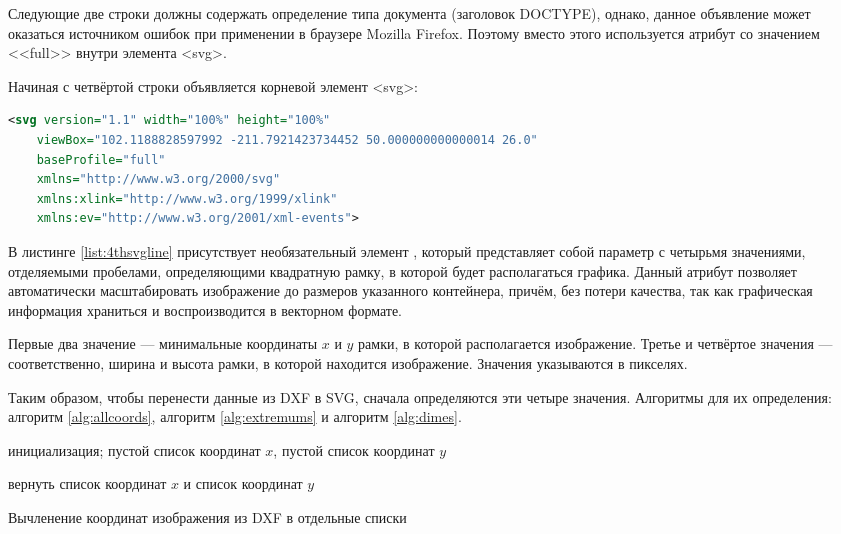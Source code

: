 Следующие две строки должны содержать определение типа документа (заголовок DOCTYPE), однако, данное объявление может оказаться источником ошибок при применении в браузере Mozilla Firefox. Поэтому вместо этого используется атрибут  со значением <<full>> внутри элемента <svg>.

Начиная с четвёртой строки объявляется корневой элемент <svg>:

\begin{lstlisting}[language=XML,caption={Первая строка SVG-файлов},label=list:4thsvgline]
	<svg version="1.1" width="100%" height="100%"
	viewBox="102.1188828597992 -211.7921423734452 50.000000000000014 26.0"
	baseProfile="full"
	xmlns="http://www.w3.org/2000/svg"
	xmlns:xlink="http://www.w3.org/1999/xlink"
	xmlns:ev="http://www.w3.org/2001/xml-events">
\end{lstlisting}

В листинге \ref{list:4thsvgline} присутствует необязательный элемент , который представляет собой параметр с четырьмя значениями, отделяемыми пробелами, определяющими квадратную рамку, в которой будет располагаться графика. Данный атрибут позволяет автоматически масштабировать изображение до размеров указанного контейнера, причём, без потери качества, так как графическая информация храниться и воспроизводится в векторном формате.

Первые два значение --- минимальные координаты $x$ и $y$ рамки, в которой располагается изображение. Третье и четвёртое значения --- соответственно, ширина и высота рамки, в которой находится изображение. Значения указываются в пикселях.

Таким образом, чтобы перенести данные из DXF в SVG, сначала определяются эти четыре значения. Алгоритмы для их определения: алгоритм \ref{alg:allcoords}, алгоритм \ref{alg:extremums} и алгоритм \ref{alg:dimes}.

\begin{algorithm}[H]
	\SetAlgoLined
	инициализация; пустой список координат $x$, пустой список координат $y$
	
	
	
	вернуть список координат $x$ и список координат $y$
	\caption{Вычленение координат изображения из DXF в отдельные списки}
	\label{alg:allcoords}
\end{algorithm}

